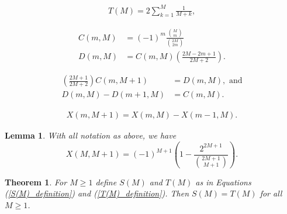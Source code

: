 \documentclass[10pt,a4paper]{amsart}
\newtheorem{thm}{Theorem}
\newtheorem{lem}{Lemma}
\begin{document}
\begin{align} \label{T(M)_definition}
T(M) = 2 \sum_{k=1}^{M} \frac{1}{M+k},
\end{align}

\begin{align}
C(m,M) &=(-1)^m \frac{\binom{M}{m}}{\binom{2M}{2m}} \\
D(m,M) &= C(m,M) \left(\frac{2M-2m+1}{2M+2} \right). \label{D(m,M)_definition}
\end{align}

\begin{align}
\left( \frac{2M+1}{2M+2} \right) C(m,M+1) &= D(m,M),\text{ and} \label{CD_identity_1} \\
D(m,M) - D(m+1,M) &= C(m,M). \label{CD_identity_2} 
\end{align}

\begin{align} \label{X(m,M)_identity}
X(m,M+1) = X(m,M) - X(m-1,M).
\end{align}

\begin{lem} \label{X(M,M+1)_lemma}
With all notation as above, we have 
\[
X(M,M+1) = (-1)^{M+1}\left(1 - \frac{2^{2M+1}}{\binom{2M+1}{M+1}}\right).
\]
\end{lem}

\begin{thm} \label{induction_theorem}
For $M \geq 1$ define $S(M)$ and $T(M)$ as in Equations (\ref{S(M)_definition}) and (\ref{T(M)_definition}).  Then $S(M) = T(M)$ for all $M \geq 1$.
\end{thm}
\end{document}
